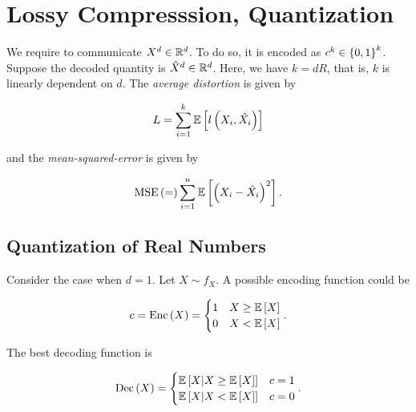 \documentclass[twoside]{article}
\begin{document}



\section{Lossy Compresssion, Quantization}

We require to communicate \(X^d\in\mathbb R^d\). To do so, it is encoded as \(c^k\in\left\{0,1\right\}^k\). Suppose the decoded quantity is \(\hat{X}^d\in\mathbb R^d\). Here, we have \(k = dR\), that is, \(k\) is linearly dependent on \(d\). The \emph{average distortion} is given by

\begin{equation}
    L = \sum_{i=1}^k\mathbb{E}\left[ l\left(X_i,\hat{X_i}\right) \right]
    \label{eq:avg-dist}
\end{equation}

and the \emph{mean-squared-error} is given by

\begin{equation}
    \mathrm{MSE}\left(=\right) \sum_{i=1}^n\mathbb{E}\left[ \left(X_i-\hat{X_i}\right)^2 \right].
    \label{eq:mse-def}
\end{equation}

\subsection{Quantization of Real Numbers}

Consider the case when \(d=1\). Let \(X\sim f_X\). A possible encoding function could be

\begin{equation}
    c = \mathrm{Enc}\left(X\right) =
    \begin{cases}
        1 & X \ge \mathbb{E}\left[ X \right] \\
        0 & X < \mathbb{E}\left[ X \right]
    \end{cases}.
    \label{eq:enc-possible}
\end{equation}

The best decoding function is

\begin{equation}
    \mathrm{Dec}\left(X\right) =
    \begin{cases}
        \mathbb{E}\left[ X|X\ge\mathbb{E}\left[ X \right] \right] & c = 1 \\
        \mathbb{E}\left[ X|X<\mathbb{E}\left[ X \right] \right] & c = 0
    \end{cases}.
    \label{eq:dec-possible}
\end{equation}
\end{document}

